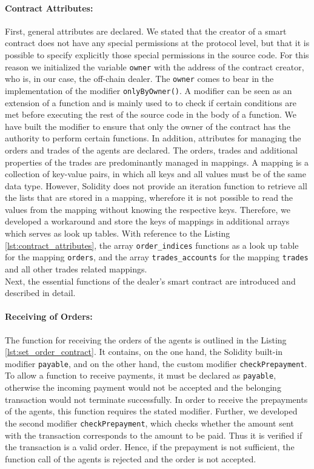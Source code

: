 \paragraph{Contract Attributes:} First, general attributes are declared.
We stated that the creator of a smart contract does not have any special permissions at the protocol level, but
that it is possible to specify explicitly those special permissions in the source code.  
For this reason we initialized the variable \verb|owner| with the address of the contract creator, who is, in our case,
the off-chain dealer. The \verb|owner| comes to bear in the implementation of the modifier \verb|onlyByOwner()|.
A modifier can be seen as an extension of a function and is mainly used to 
to check if certain conditions are met before executing the rest of the source code in the body of a function.
We have built the modifier to ensure that only the owner of the contract has the authority to perform certain functions.
In addition, attributes for managing the orders and trades of the agents are declared. 
The orders, trades and additional properties of the trades are predominantly managed in mappings.
A mapping is a collection of key-value pairs, in which all keys and all values must be of the same 
data type. However, Solidity does not provide an iteration
function to retrieve all the lists that are stored in a mapping, wherefore it is not possible 
to read the values from the mapping without knowing the respective keys.
Therefore, we developed a workaround and store the keys of mappings in additional arrays which serves 
as look up tables.
With reference to the Listing \ref{lst:contract_attributes}, the array \verb|order_indices| functions as a 
look up table for the mapping \verb|orders|, and the array \verb|trades_accounts| for the mapping 
\verb|trades| and all other trades related mappings. \\

Next, the essential functions of the dealer's smart contract are introduced and described in detail.

\paragraph{Receiving of Orders:} The function for receiving the orders of the agents is outlined in the Listing \ref{lst:set_order_contract}.
It contains, on the one hand, the Solidity built-in modifier \verb|payable|, and on the other hand, the custom
modifier \verb|checkPrepayment|. To allow a function to receive payments, it must be declared as \verb|payable|,
otherwise the incoming payment would not be accepted and the belonging transaction would not terminate successfully.
In order to receive the prepayments of the agents, this function requires the stated modifier.
Further, we developed the second modifier \verb|checkPrepayment|, which checks whether the amount sent with the 
transaction corresponds to the amount to be paid. Thus it is verified if the transaction is a valid order.
Hence, if the prepayment is not sufficient, the function call of the agents is rejected and 
the order is not accepted.


